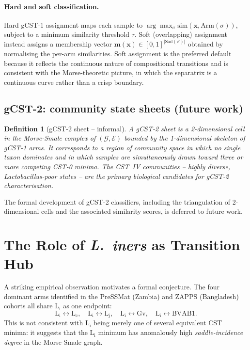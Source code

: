 \documentclass[11pt]{article}
\theoremstyle{plain}
\newtheorem{definition}{Definition}[section]
\newcommand{\E}{\mathcal{E}}
\newcommand{\G}{\mathcal{G}}
\newcommand{\Sad}{\mathrm{Sad}}
\newcommand{\Li}{\mathrm{L}_\mathrm{i}}
\newcommand{\Lc}{\mathrm{L}_\mathrm{c}}
\newcommand{\Lj}{\mathrm{L}_\mathrm{j}}
\newcommand{\Gv}{\mathrm{Gv}}
\newcommand{\BVAB}{\mathrm{BVAB1}}
\begin{document}
\paragraph{Hard and soft classification.}
Hard gCST-1 assignment maps each sample to
$\arg\max_\sigma \mathrm{sim}(\mathbf{x}, \mathrm{Arm}(\sigma))$, subject to a
minimum similarity threshold $\tau$.  Soft (overlapping) assignment instead
assigns a membership vector
$\mathbf{m}(\mathbf{x}) \in [0,1]^{|\Sad(\E)|}$ obtained by
normalising the per-arm similarities.  Soft assignment is the preferred default
because it reflects the continuous nature of compositional transitions and is
consistent with the Morse-theoretic picture, in which the separatrix is a
continuous curve rather than a crisp boundary.

\subsection{gCST-2: community state sheets (future work)}
\label{sec:gcst2}

\begin{definition}[gCST-2 sheet -- informal]
  A \emph{gCST-2 sheet} is a 2-dimensional cell in the Morse-Smale complex of
  $(\G, \E)$ bounded by the 1-dimensional skeleton of gCST-1 arms.  It
  corresponds to a region of community space in which no single taxon dominates
  and in which samples are simultaneously drawn toward three or more competing
  CST-0 minima.  The CST~IV communities -- highly diverse, Lactobacillus-poor
  states -- are the primary biological candidates for gCST-2 characterisation.
\end{definition}

The formal development of gCST-2 classifiers, including the triangulation of
2-dimensional cells and the associated similarity scores, is deferred to future
work.

\section{The Role of \textit{L.\ iners} as Transition Hub}
\label{sec:li-hub}

A striking empirical observation motivates a formal conjecture.  The four
dominant arms identified in the PreSSMat (Zambia) and ZAPPS (Bangladesh)
cohorts all share $\Li$ as one endpoint:
\[
  \Li \leftrightarrow \Lc, \quad
  \Li \leftrightarrow \Lj, \quad
  \Li \leftrightarrow \Gv, \quad
  \Li \leftrightarrow \BVAB.
\]
This is not consistent with $\Li$ being merely one of several equivalent CST
minima: it suggests that the $\Li$ minimum has anomalously high
\emph{saddle-incidence degree} in the Morse-Smale graph.
\end{document}
